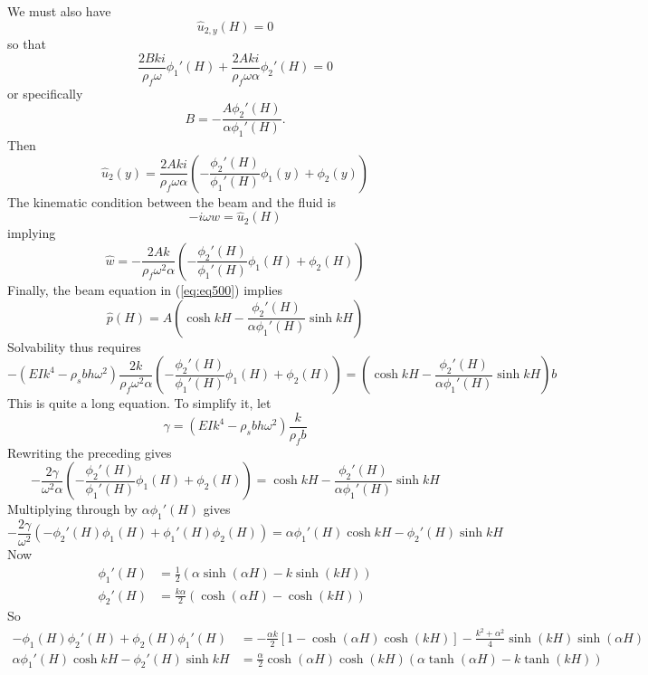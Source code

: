 \documentclass{article}
\begin{document}
We must also have
\[\hat{u}_{2,y}(H) = 0 \]
so that
\[ \frac{2Bki}{\rho _f\omega}\phi_1'(H)+\frac{2Aki}{\rho_f \omega \alpha}\phi_2'(H) = 0 \]
or specifically
\[ B = -\frac{A\phi_2'(H)}{\alpha \phi_1'(H)}. \]
Then
\begin{equation} \hat{u}_2(y) = \frac{2Aki}{\rho_f \omega \alpha}\left(-\frac{\phi_2'(H)}{\phi_1'(H)}\phi_1(y)+\phi_2(y)\right)   \label{eq:eq1000} \end{equation}
The kinematic condition between the beam and the fluid is
\[ -i\omega \hat{w} = \hat{u}_2(H) \]
implying
\begin{equation} \hat{w} = -\frac{2Ak}{\rho_f \omega^2 \alpha}\left(-\frac{\phi_2'(H)}{\phi_1'(H)}\phi_1(H)+\phi_2(H)\right)   \label{eq:eq1100} \end{equation}
Finally, the beam equation in (\ref{eq:eq500}) implies 
\begin{equation} \hat{p}(H) = A\left(\cosh{kH}-\frac{\phi_2'(H)}{\alpha \phi_1'(H)}\sinh{kH}\right) \label{eq:eq1200} \end{equation}
Solvability thus requires
\[-(EIk^4-\rho_s b h\omega^2)\frac{2k}{\rho_f \omega^2 \alpha}\left(-\frac{\phi_2'(H)}{\phi_1'(H)}\phi_1(H)+\phi_2(H)\right)=\left(\cosh{kH}-\frac{\phi_2'(H)}{\alpha \phi_1'(H)}\sinh{kH}\right)b\]
This is quite a long equation.  
To simplify it, let
\[ \gamma = (EIk^4-\rho_s b h\omega^2)\frac{k}{\rho_f b} \]
Rewriting the preceding gives
\begin{equation} -\frac{2\gamma}{\omega^2 \alpha}\left(-\frac{\phi_2'(H)}{\phi_1'(H)}\phi_1(H)+\phi_2(H)\right)=\cosh{kH}-\frac{\phi_2'(H)}{\alpha \phi_1'(H)}\sinh{kH}  \label{eq:eq1300} \end{equation}
Multiplying through by $\alpha \phi_1'(H)$ gives
\[-\frac{2\gamma}{\omega^2}\left(-\phi_2'(H)\phi_1(H)+\phi_1'(H)\phi_2(H)\right)=\alpha \phi_1'(H)\cosh{kH}-\phi_2'(H)\sinh{kH}\]
Now
\begin{align*}
\phi_1'(H) &= \frac{1}{2}\left(\alpha\sinh(\alpha H)-k\sinh(k H)\right) \\
\phi_2'(H) &= \frac{k\alpha}{2}\left(\cosh(\alpha H)-\cosh(k H)\right)
\end{align*}
So
\begin{align*}
-\phi_1(H)\phi_2'(H)+\phi_2(H)\phi_1'(H)&=-\frac{\alpha k}{2}\left[1-\cosh(\alpha H)\cosh(k H)\right]-\frac{k^2+\alpha^2}{4}\sinh(kH)\sinh(\alpha H) \\
\alpha \phi_1'(H)\cosh{kH}-\phi_2'(H)\sinh{kH} &= \frac{\alpha}{2}\cosh(\alpha H)\cosh(k H) \left(\alpha\tanh(\alpha H)-k\tanh(kH) \right)
\end{align*}
\end{document}
